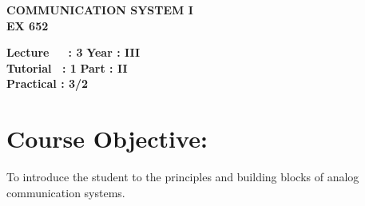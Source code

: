 \begin{center}
    \textbf{\huge{\uppercase{Communication System I}}}
    \\
    \vspace{.5cm}
    \textbf{\large{EX 652}}
\end{center}

\noindent\textbf{Lecture\ \ \ : 3} \hfill \textbf{Year : III} \\
\textbf{Tutorial \ : 1} \hfill \textbf{Part : II } \\
\textbf{Practical : 3/2}  \\

\par
\noindent 
\section*{Course Objective:}
To introduce the student to the principles and building blocks of analog communication systems.


